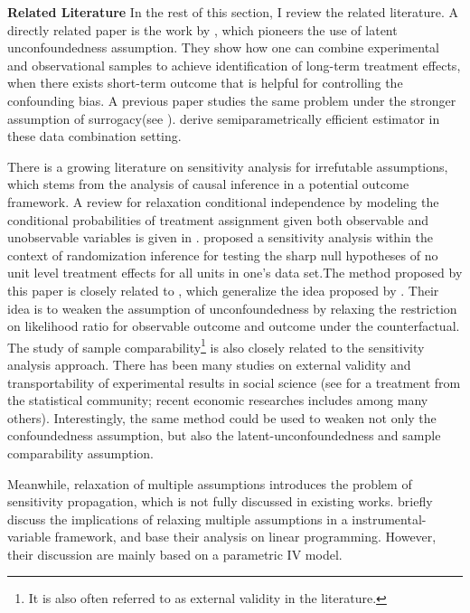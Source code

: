 \documentclass[12pt]{article}
\begin{document}
	\medskip
	\textbf{Related Literature} In the rest of this section, I review the related literature. A directly related paper is the work by \textcite{athey2020combining}, which pioneers the use of latent unconfoundedness assumption. They show how one can combine experimental and observational samples to achieve identification of long-term treatment effects, when there exists short-term outcome that is helpful for controlling the confounding bias. A previous paper studies the same problem under the stronger assumption of surrogacy(see \textcite{athey2019surrogate}). \textcite{chen2021semiparametric} derive semiparametrically efficient estimator in these data combination setting. 

    There is a growing literature on sensitivity analysis for irrefutable assumptions, which stems from the analysis of causal inference in a potential outcome framework. A review for relaxation conditional independence by modeling the conditional probabilities of treatment assignment given both observable and unobservable variables is given in \textcite{masten2018identification}. \textcite{rosenbaum2002overt} proposed a sensitivity analysis within the context of randomization inference for testing the sharp null hypotheses of no unit level treatment effects for all units in one’s data set.The method proposed by this paper is closely related to \textcite{yadlowsky2018bounds}, which generalize the idea proposed by \textcite{rosenbaum2002overt}. Their idea is to weaken the assumption of unconfoundedness by relaxing the restriction on likelihood ratio for observable outcome and outcome under the counterfactual. The study of sample comparability\footnote{It is also often referred to as external validity in the literature.} is also closely related to the sensitivity analysis approach. There has been many studies on external validity and transportability of experimental results in social science (see \textcite{pearl2014external,bareinboim2016causal} for a treatment from the statistical community; recent economic researches includes  \textcite{allcott2015site,gechter2016generalizing,gechter2021combining} among many others). Interestingly, the same method could be used to weaken not only the confoundedness assumption, but also the latent-unconfoundedness and sample comparability assumption. 

    Meanwhile, relaxation of multiple assumptions introduces the problem of sensitivity propagation, which is not fully discussed in existing works. \textcite{masten2021salvaging} briefly discuss the implications of relaxing multiple assumptions in a instrumental-variable framework, and base their analysis on linear programming. However, their discussion are mainly based on a parametric IV model.
\end{document}
